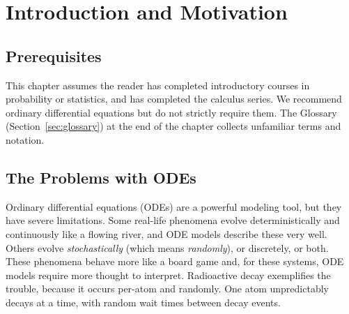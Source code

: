 \section{Introduction and Motivation}\label{sec:intro}



\subsection{Prerequisites}\label{subsec:prerequisites}

This chapter assumes the reader has completed introductory courses in probability or statistics, and has completed the calculus series. We recommend ordinary differential equations but do not strictly require them. The Glossary (Section~\ref{sec:glossary}) at the end of the chapter collects unfamiliar terms and notation.


\subsection{The Problems with ODEs}\label{subsec:problems_with_odes}


Ordinary differential equations (ODEs) are a powerful modeling tool, but they have severe limitations. Some real-life phenomena evolve deterministically and continuously like a flowing river, and ODE models describe these very well. Others evolve \textit{stochastically} (which means \textit{randomly}), or discretely, or both. These phenomena behave more like a board game and, for these systems, ODE models require more thought to interpret.
Radioactive decay exemplifies the trouble, because it occurs per-atom and randomly. One atom unpredictably decays at a time, with random wait times between decay events.


